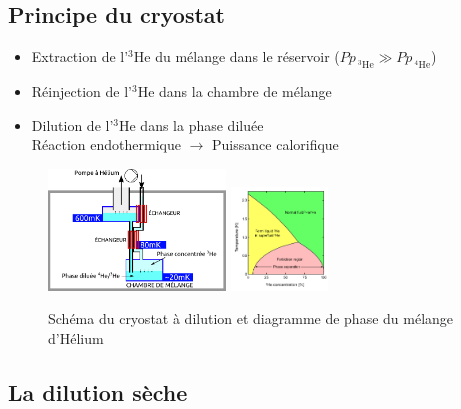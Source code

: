 \documentclass[8pt,a9paper]{beamer} \usepackage[utf8]{inputenc} \usepackage[francais]{babel} \usepackage[T1]{fontenc}
\newcommand{\HeT}{$^3$He\xspace}
\begin{document}
\subsection{Principe du cryostat}
\begin{frame}
\begin{itemize}
    \item Extraction de l'\HeT du mélange dans le réservoir 
        ($Pp_{\: ^3\text{He}} \gg  Pp_{\: ^4\text{He}} $)
        \vspace{2mm}
    \item Réinjection de l'\HeT dans la chambre de mélange
            \vspace{2mm}
    \item Dilution de l'\HeT dans la phase diluée\\
    Réaction endothermique $\rightarrow$ Puissance calorifique
\end{itemize}

\begin{figure}[h]
  \begin{center}
    \includegraphics[width=0.42\textwidth]{Images/Cryostat_Schema.pdf}
    \qquad
    \includegraphics[width=0.23\textwidth]{Images/Helium_phase_diagram.pdf}
    \caption{Schéma du cryostat à dilution et diagramme de phase du mélange d'Hélium}
  \end{center}
\end{figure}


\end{frame}
\subsection{La dilution sèche}
\begin{frame}
\end{frame}
\end{document}
